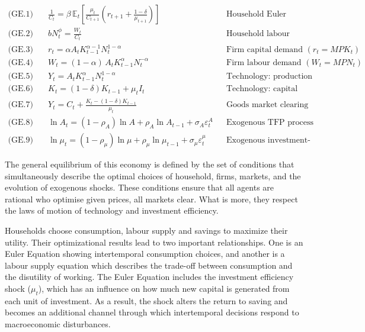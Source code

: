 \documentclass[12pt]{article}
\begin{document}
\begin{align*}
\text{(GE.1)}\quad 
& \frac{1}{C_t} = \beta \, \mathbb{E}_t \left[ \frac{\mu_t}{C_{t+1}} \left( r_{t+1} + \frac{1-\delta}{\mu_{t+1}} \right) \right]
&& \text{Household Euler equation} \tag{12}\\
\text{(GE.2)}\quad
& b N_t^{\phi} = \frac{W_t}{C_t}
&& \text{Household labour supply}\tag{10} \\
\text{(GE.3)}\quad
& r_t = \alpha A_t K_{t-1}^{\alpha-1} N_t^{1-\alpha}
&& \text{Firm capital demand } (r_t = MPK_t)\tag{15} \\
\text{(GE.4)}\quad
& W_t = (1-\alpha)\, A_t K_{t-1}^{\alpha} N_t^{-\alpha}
&& \text{Firm labour demand } (W_t = MPN_t) \tag{14}\\
\text{(GE.5)}\quad
& Y_t = A_t K_{t-1}^{\alpha} N_t^{1-\alpha}
&& \text{Technology: production function}\tag{5} \\
\text{(GE.6)}\quad
& K_t = (1-\delta)K_{t-1} + \mu_t I_t
&& \text{Technology: capital accumulation} \tag{3}\\
\text{(GE.7)}\quad
& Y_t = C_t + \frac{K_t - (1-\delta)K_{t-1}}{\mu_t}
&& \text{Goods market clearing (resource constraint)}\tag{18} \\
\text{(GE.8)}\quad
& \ln A_t = (1-\rho_A)\ln A + \rho_A \ln A_{t-1} + \sigma_A \varepsilon_t^{A}
&& \text{Exogenous TFP process}\tag{6} \\
\text{(GE.9)}\quad
& \ln \mu_t = (1-\rho_{\mu})\ln \mu + \rho_{\mu} \ln \mu_{t-1} + \sigma_{\mu} \varepsilon_t^{\mu}
&& \text{Exogenous investment-efficiency process}\tag{4}
\end{align*}

The general equilibrium of this economy is defined by the set of conditions that simultaneously describe the optimal choices of household, firms, markets, and the evolution of exogenous shocks. These conditions ensure that all agents are rational who optimise given prices, all markets clear. What is more, they respect the laws of motion of technology and investment efficiency.

Households choose consumption, labour supply and savings to maximize their utility. Their optimizational results lead to two important relationships. One is an Euler Equation showing intertemporal consumption choices, and another is a labour supply equation which describes the trade-off between consumption and the disutility of working. The Euler Equation includes the investment efficiency shock ($\mu_t$), which has an influence on how much new capital is generated from each unit of investment. As a result,  the shock alters the return to saving and becomes an additional channel through which intertemporal decisions respond to macroeconomic disturbances.
\end{document}
